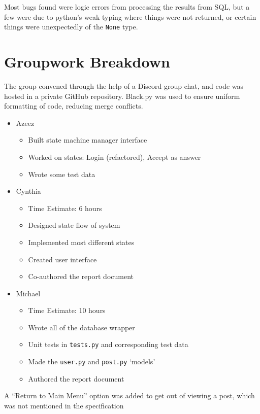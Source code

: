 \documentclass{article}
\begin{document}
Most bugs found were logic errors from processing the results from SQL, but a few were due to python's weak typing where things were not returned, or certain things were unexpectedly of the \verb|None| type.

\section{Groupwork Breakdown}

The group convened through the help of a Discord group chat, and code was hosted in a private GitHub repository. Black.py was used to ensure uniform formatting of code, reducing merge conflicts.

\begin{itemize}
    \item Azeez
          \begin{itemize}
              \item Built state machine manager interface
              \item Worked on states: Login (refactored), Accept as answer
              \item Wrote some test data
          \end{itemize}
    \item Cynthia
          \begin{itemize}
              \item Time Estimate: 6 hours
              \item Designed state flow of system
              \item Implemented most different states
              \item Created user interface
              \item Co-authored the report document
          \end{itemize}
    \item Michael
          \begin{itemize}
              \item Time Estimate: 10 hours
              \item Wrote all of the database wrapper
              \item Unit tests in \verb|tests.py| and corresponding test data
              \item Made the \verb|user.py| and \verb|post.py| `models'
              \item Authored the report document
          \end{itemize}
\end{itemize}

A ``Return to Main Menu'' option was added to get out of viewing a post, which was not mentioned in the specification
\end{document}
